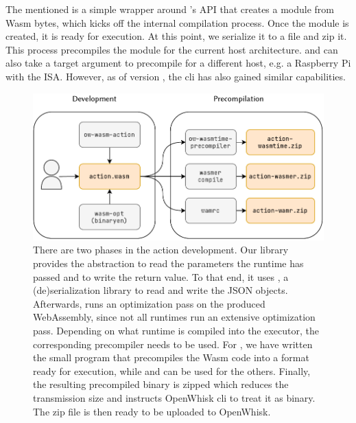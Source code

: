 The mentioned  is a simple wrapper around 's API that creates a module from Wasm bytes, which kicks off the internal compilation process. Once the module is created, it is ready for execution. At this point, we serialize it to a file and zip it. This process precompiles the module for the current host architecture.  and  can also take a target argument to precompile for a different host, e.g. a Raspberry Pi with the  ISA. However, as of version , the  cli has also gained similar capabilities.

\begin{figure}
    \centering
    \includegraphics{figures/ActionCreationFlow.pdf}
    \caption{There are two phases in the action development. Our  library provides the abstraction to read the parameters the runtime has passed and to write the return value. To that end, it uses , a (de)serialization library to read and write the JSON objects. Afterwards,  runs an optimization pass on the produced WebAssembly, since not all runtimes run an extensive optimization pass.
    Depending on what runtime is compiled into the executor, the corresponding precompiler needs to be used. For , we have written the small  program that precompiles the Wasm code into a format ready for execution, while  and  can be used for the others. Finally, the resulting precompiled binary is zipped which reduces the transmission size and instructs OpenWhisk cli to treat it as binary. The zip file is then ready to be uploaded to OpenWhisk.}
    \label{fig:action-creation-flow}
\end{figure}

